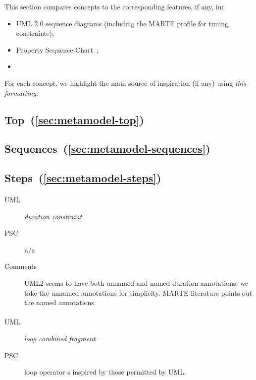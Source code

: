 \newcommand{\insp}[1]{\textsl{#1}}

This section compares \langname{} concepts to the
corresponding features, if any, in:

\begin{itemize}
\item
  UML 2.0 sequence diagrams (including the MARTE profile for timing
  constraints);
\item
  Property Sequence Chart~\cite{psc};
\item
\end{itemize}

For each concept, we highlight the main source of inspiration (if any)
using \insp{this formatting}.

\subsection{Top~(\ref{sec:metamodel-top})}

\subsection{Sequences~(\ref{sec:metamodel-sequences})}

\subsection{Steps~(\ref{sec:metamodel-steps})}

\paragraph{\mdeadlinestep}
\begin{description}
\item[UML] \insp{duration constraint}
\item[PSC] n/a
\item[Comments] UML2 seems to have both unnamed and named duration
  annotations; we take the unnamed annotations for simplicity.  MARTE
  literature points out the named annotations.  
\end{description}
      
\paragraph{\mloopstep}
\begin{description}
\item[UML] \insp{loop combined fragment}
\item[PSC] loop operator
    \mloopbound s inspired by those permitted by UML.
\end{description}

